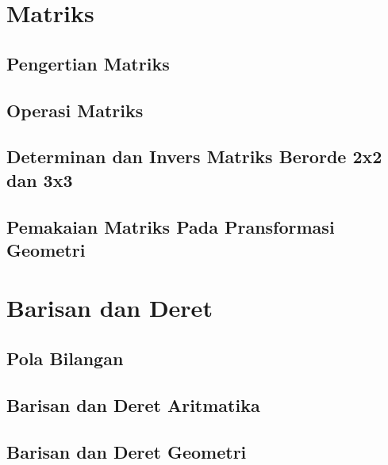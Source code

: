 \documentclass[11pt,fleqn]{book} %
\begin{document}
\chapter{Matriks}

\section{Pengertian Matriks}

\section{Operasi Matriks}

\section{Determinan dan Invers Matriks Berorde 2x2 dan 3x3 }

\section{Pemakaian Matriks Pada Pransformasi Geometri}



\chapter{Barisan dan Deret}

\section{Pola Bilangan}

\section{Barisan dan Deret Aritmatika}

\section{Barisan dan Deret Geometri}
\end{document}
